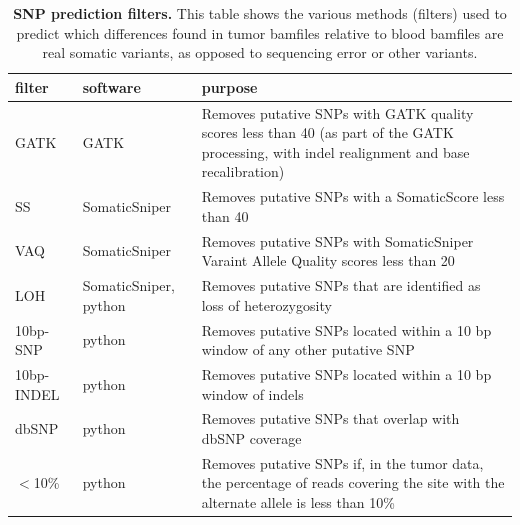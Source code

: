 \documentclass[11pt]{article} %
\begin{document}
\begin{landscape}
\begin{table}
\caption{\textbf{SNP prediction filters.} This table shows the various methods (filters) used to predict which differences found in tumor bamfiles relative to blood bamfiles are real somatic variants, as opposed to sequencing error or other variants.}
\begin{tabular}{ p{2.25cm} p{4.25cm} p{14cm} }
	filter & software & purpose \\
	\hline
	GATK & GATK & Removes putative SNPs with GATK quality scores less than 40 (as part of the GATK processing, with indel realignment and base recalibration) \\
	SS & SomaticSniper & Removes putative SNPs with a SomaticScore less than 40 \\
	VAQ & SomaticSniper & Removes putative SNPs with SomaticSniper Varaint Allele Quality scores less than 20 \\
	LOH & SomaticSniper, python & Removes putative SNPs that are identified as loss of heterozygosity \\
	10bp-SNP & python & Removes putative SNPs located within a 10 bp window of any other putative SNP \\
	10bp-INDEL & python & Removes putative SNPs located within a 10 bp window of indels \\
	dbSNP & python & Removes putative SNPs that overlap with dbSNP coverage \\
	$<$10\% & python & Removes putative SNPs if, in the tumor data, the percentage of reads covering the site with the alternate allele is less than 10\% \\
\end{tabular}
\end{table}
\end{landscape}
\end{document}

